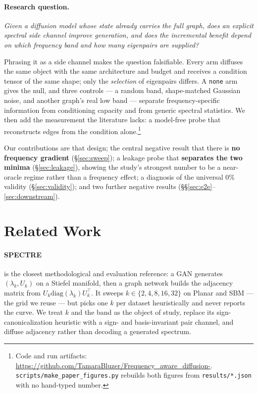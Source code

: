 \documentclass[11pt]{article}
\begin{document}
\paragraph{Research question.} \emph{Given a diffusion model whose state already carries the full
graph, does an explicit spectral side channel improve generation, and does the incremental benefit
depend on which frequency band and how many eigenpairs are supplied?}

Phrasing it as a side channel makes the question falsifiable. Every arm diffuses the same object
with the same architecture and budget and receives a condition tensor of the same shape; only the
\emph{selection} of eigenpairs differs. A \texttt{none} arm gives the null, and three controls ---
a random band, shape-matched Gaussian noise, and another graph's real low band --- separate
frequency-specific information from conditioning capacity and from generic spectral statistics. We
then add the measurement the literature lacks: a model-free probe that reconstructs edges
from the condition alone.\footnote{Code and run artifacts:
\url{https://github.com/TamaraBluzer/Frequency_aware_diffusion-}.
\texttt{scripts/make\_paper\_figures.py} rebuilds both figures from \texttt{results/*.json} with
no hand-typed number.}

Our contributions are that design; the central negative result that there is \textbf{no frequency
gradient} (\S\ref{sec:sweep}); a leakage probe that \textbf{separates the two minima}
(\S\ref{sec:leakage}), showing the study's strongest number to be a near-oracle regime rather than
a frequency effect; a diagnosis of the universal $0\%$ validity (\S\ref{sec:validity}); and two
further negative results (\S\S\ref{sec:e2e}--\ref{sec:downstream}).

\section{Related Work}
\label{sec:related}

\paragraph{SPECTRE} \citep{martinkus2022spectre} is the closest methodological and evaluation
reference: a GAN generates $(\lambda_k, U_k)$ on a Stiefel manifold, then a graph network builds
the adjacency matrix from $U_k \mathrm{diag}(\lambda_k) U_k^\top$. It sweeps $k \in \{2,4,8,16,32\}$ on Planar and SBM --- the grid we reuse --- but picks
one $k$ per dataset heuristically and never reports the curve. We treat $k$ and the band as the object of
study, replace its sign-canonicalization heuristic with a sign- and basis-invariant pair channel,
and diffuse adjacency rather than decoding a generated spectrum.
\end{document}
